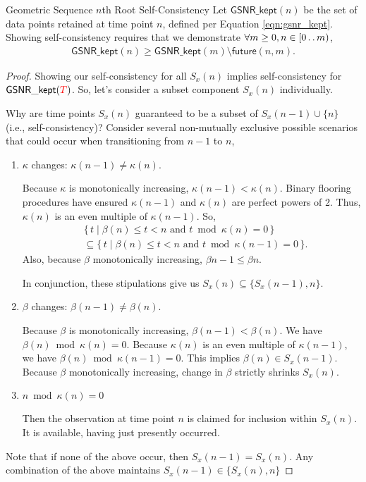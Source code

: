 \begin{theorem}{Geometric Sequence $n$th Root Self-Consistency}
\label{thm:geom-seq-nth-root-algo-self-consistency}
Let $\mathsf{GSNR\_kept}(n)$ be the set of data points retained at time point $n$, defined per Equation \ref{eqn:gsnr_kept}.
Showing self-consistency requires that we demonstrate $\forall m \geq 0, n \in [0 \mathinner {\ldotp \ldotp} m)$,
\begin{align*}
\mathsf{GSNR\_kept}(n)
\geq
\mathsf{GSNR\_kept}(m)
\setminus
\mathsf{future}(n, m).
\end{align*}
\end{theorem}

\begin{proof}
\label{prf:geom-seq-nth-root-algo-self-consistency}
Showing our self-consistency for all $S_x(n)$ implies self-consistency for $\mathsf{GSNR\_kept}(\colorT)$.
So, let's consider a subset component $S_x(n)$ individually.

Why are time points $S_x(n)$ guaranteed to be a subset of $S_x(n-1) \cup \{n\}$ (i.e., self-consistency)?
Consider several non-mutually exclusive possible scenarios that could occur when transitioning from $n - 1$ to $n$,
\begin{enumerate}
  \item $\kappa$ changes: $\kappa(n - 1) \neq \kappa(n)$.

  Because $\kappa$ is monotonically increasing, $\kappa(n - 1) < \kappa(n)$.
  Binary flooring procedures have ensured $\kappa(n - 1)$ and $\kappa(n)$ are perfect powers of 2.
  Thus, $\kappa(n)$ is an even multiple of $\kappa(n - 1)$.
  So,
  \begin{align*}
    &\{\, t \mid \beta(n) \leq t < n \text{ and } t \bmod \kappa(n) = 0 \,\}\\
    &\subseteq \{\, t \mid \beta(n) \leq t < n \text{ and } t \bmod \kappa(n - 1) = 0 \,\}.
  \end{align*}
  Also, because $\beta$ monotonically increasing, $\beta{n - 1} \leq \beta{n}$.

  In conjunction, these stipulations give us $S_x(n) \subseteq \{S_x(n - 1), n\}$.

  \item $\beta$ changes: $\beta(n - 1) \neq \beta(n)$.

  Because $\beta$ is monotonically increasing, $\beta(n - 1) < \beta(n)$.
  We have $\beta(n) \bmod \kappa(n) = 0$.
  Because $\kappa(n)$ is an even multiple of $\kappa(n - 1)$, we have $\beta(n) \bmod \kappa(n - 1) = 0$.
  This implies $\beta(n) \in S_x(n - 1)$.
  Because $\beta$ monotonically increasing, change in $\beta$ strictly shrinks $S_x(n)$.

  \item $n \bmod \kappa(n) = 0$

  Then the observation at time point $n$ is claimed for inclusion within $S_x(n)$.
  It is available, having just presently occurred.

\end{enumerate}

Note that if none of the above occur, then $S_x(n - 1) = S_x(n)$.
Any combination of the above maintains $S_x(n - 1) \in \{S_x(n), n\}$
\end{proof}
